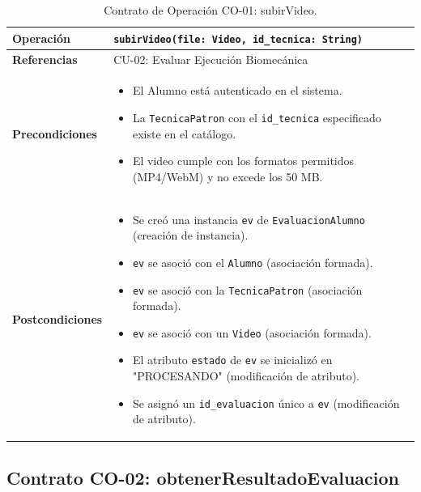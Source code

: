 \documentclass[12pt,letterpaper]{article}
\begin{document}
\begin{table}[H]
\centering
\small
\begin{tabular}{|p{3cm}|p{11cm}|}
\hline
\textbf{Operación} & \texttt{subirVideo(file: Video, id\_tecnica: String)} \\
\hline
\textbf{Referencias} & CU-02: Evaluar Ejecución Biomecánica \\
\hline
\textbf{Precondiciones} & \begin{itemize}
    \item El Alumno está autenticado en el sistema.
    \item La \texttt{TecnicaPatron} con el \texttt{id\_tecnica} especificado existe en el catálogo.
    \item El video cumple con los formatos permitidos (MP4/WebM) y no excede los 50 MB.
\end{itemize} \\
\hline
\textbf{Postcondiciones} & \begin{itemize}
    \item Se creó una instancia \texttt{ev} de \texttt{EvaluacionAlumno} (creación de instancia).
    \item \texttt{ev} se asoció con el \texttt{Alumno} (asociación formada).
    \item \texttt{ev} se asoció con la \texttt{TecnicaPatron} (asociación formada).
    \item \texttt{ev} se asoció con un \texttt{Video} (asociación formada).
    \item El atributo \texttt{estado} de \texttt{ev} se inicializó en "PROCESANDO" (modificación de atributo).
    \item Se asignó un \texttt{id\_evaluacion} único a \texttt{ev} (modificación de atributo).
\end{itemize} \\
\hline
\end{tabular}
\caption{Contrato de Operación CO-01: subirVideo.}
\label{tab:contrato-subir-video}
\end{table}

\subsection{Contrato CO-02: obtenerResultadoEvaluacion}
\label{subsec:contrato-obtener-resultado}
\end{document}
